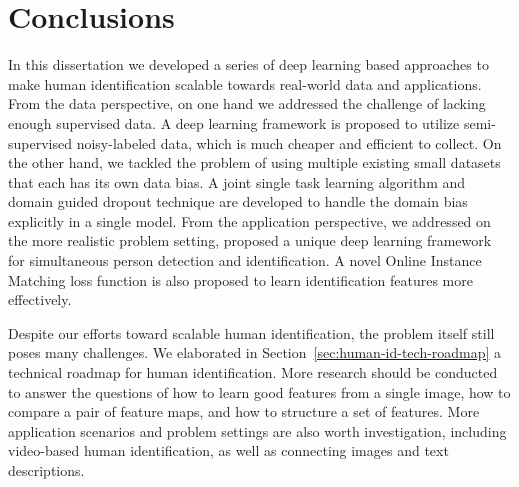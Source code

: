 \chapter{Conclusions}
\label{ch:conclusions}
In this dissertation we developed a series of deep learning based approaches to make human identification scalable towards real-world data and applications. From the data perspective, on one hand we addressed the challenge of lacking enough supervised data. A deep learning framework is proposed to utilize semi-supervised noisy-labeled data, which is much cheaper and efficient to collect. On the other hand, we tackled the problem of using multiple existing small datasets that each has its own data bias. A joint single task learning algorithm and domain guided dropout technique are developed to handle the domain bias explicitly in a single model. From the application perspective, we addressed on the more realistic problem setting, proposed a unique deep learning framework for simultaneous person detection and identification. A novel Online Instance Matching loss function is also proposed to learn identification features more effectively.

Despite our efforts toward scalable human identification, the problem itself still poses many challenges. We elaborated in Section~\ref{sec:human-id-tech-roadmap} a technical roadmap for human identification. More research should be conducted to answer the questions of how to learn good features from a single image, how to compare a pair of feature maps, and how to structure a set of features. More application scenarios and problem settings are also worth investigation, including video-based human identification, as well as connecting images and text descriptions.
